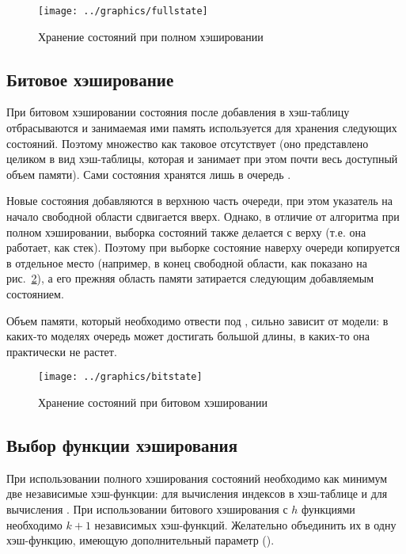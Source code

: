 \begin{figure}[ht]
  \centering
  \texttt{[image: ../graphics/fullstate]}
  \caption{Хранение состояний при полном хэшировании}
  \label{fig:fullstate}
\end{figure}

\subsection{Битовое хэширование}
\label{sec:bithash-store}

При битовом хэшировании состояния после добавления в хэш-таблицу отбрасываются и
занимаемая ими память используется для хранения следующих состояний. Поэтому множество
 как таковое отсутствует (оно представлено целиком в вид хэш-таблицы,
которая и занимает при этом почти весь доступный объем памяти). Сами состояния хранятся
лишь в очередь .

Новые состояния добавляются в верхнюю часть очереди, при этом указатель на начало
свободной области сдвигается вверх. Однако, в отличие от алгоритма при полном хэшировании,
выборка состояний также делается с верху  (т.е. она работает, как
стек). Поэтому при выборке состояние наверху очереди копируется в отдельное место
(например, в конец свободной области, как показано на рис.~\ref{fig:bitstate}), а его
прежняя область памяти затирается следующим добавляемым состоянием.

Объем памяти, который необходимо отвести под , сильно зависит от модели: в
каких-то моделях очередь может достигать большой длины, в каких-то она практически не
растет.

\begin{figure}[ht]
  \centering
  \texttt{[image: ../graphics/bitstate]}  
  \caption{Хранение состояний при битовом хэшировании}
  \label{fig:bitstate}
\end{figure}

\subsection{Выбор функции хэширования}
\label{sec:hashing-function}

При использовании полного хэширования состояний необходимо как минимум две независимые
хэш-функции: для вычисления индексов в хэш-таблице и для вычисления . При
использовании битового хэширования с $h$ функциями необходимо $k + 1$ независимых
хэш-функций. Желательно объединить их в одну хэш-функцию, имеющую дополнительный параметр
().

